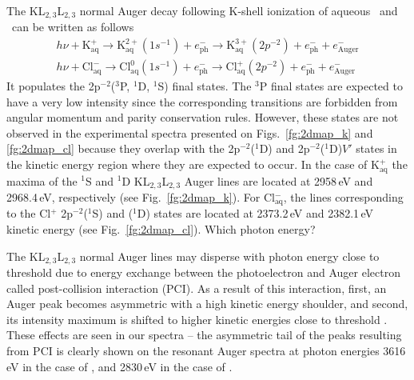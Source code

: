 The KL$_{2,3}$L$_{2,3}$ normal Auger decay following K-shell ionization of aqueous \ki~and \cli~can be written as follows
%
\begin{align*}
h\nu + \text{K}^{+}_{\text{aq}} \rightarrow 
	\text{K}^{2+}_{\text{aq}} (1s^{-1}) + e^{-}_{\text{ph}}\rightarrow
	\text{K}^{3+}_{\text{aq}} (2p^{-2}) + e^{-}_{\text{ph}} + e^{-}_{\text{Auger}}\\
h\nu + \text{Cl}^{-}_{\text{aq}} \rightarrow
	\text{Cl}^{0}_{\text{aq}} (1s^{-1}) + e^{-}_{\text{ph}}\rightarrow
	\text{Cl}^{+}_{\text{aq}}(2p^{-2}) + e^{-}_{\text{ph}} + e^{-}_{\text{Auger}}
\end{align*}
%
It populates the 2p$^{-2}$($^3$P, $^1$D, $^1$S) final states. The $^3$P final states are expected to have a very low intensity since the corresponding transitions are forbidden from angular momentum and parity conservation rules. However, these states are not observed in the experimental spectra presented on Figs.\ \ref{fg:2dmap_k} and \ref{fg:2dmap_cl} because they overlap with the 2p$^{-2}$($^1$D) and 2p$^{-2}$($^1$D)$V'$ states in the kinetic energy region where they are expected to occur. In the case of K$^{+}_{\text{aq}}$ the maxima of the $^1$S and $^1$D KL$_{2,3}$L$_{2,3}$ Auger lines are located at 2958\,eV and 2968.4\,eV, respectively (see Fig.\ \ref{fg:2dmap_k}). For Cl$^{-}_{\text{aq}}$, the lines corresponding to the Cl$^{+}$ 2p$^{-2}$($^1$S) and ($^1$D) states are located at 2373.2\,eV and 2382.1\,eV kinetic energy (see Fig.\ \ref{fg:2dmap_cl}). {\color{red}Which photon energy?}


The KL$_{2,3}$L$_{2,3}$ normal Auger lines may disperse with photon energy close to threshold due to energy exchange between the photoelectron and Auger electron called post-collision interaction (PCI). As a result of this interaction, first, an Auger peak becomes asymmetric with a high kinetic energy shoulder, and second, its intensity maximum is shifted to higher kinetic energies close to threshold \citep{russek86:911,guillemin15:012503}. These effects are seen in our spectra -- the asymmetric tail of the peaks resulting from PCI is clearly shown on the resonant Auger spectra at photon energies 3616\,eV in the case of \ki, and 2830\,eV in the case of \cli.


